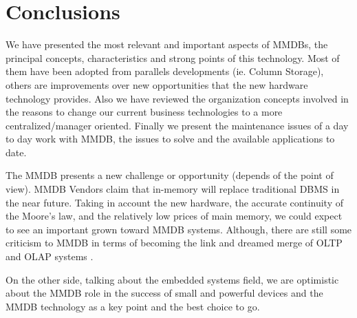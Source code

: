 \documentclass[12pt]{article} %
\begin{document}
\section{Conclusions} 

We have presented the most relevant and important aspects of MMDBs, the principal concepts, characteristics and strong points of this technology. Most of them have been adopted from parallels developments (ie. Column Storage), others are improvements over new opportunities that the new hardware technology provides. Also we have reviewed the organization concepts involved in the reasons to change our current business technologies to a more centralized/manager oriented. Finally we present the maintenance issues of a day to day work with MMDB, the issues to solve and the available applications to date. 

The MMDB presents a new challenge or opportunity (depends of the point of view). MMDB Vendors claim that in-memory will replace traditional DBMS in the near future. Taking in account the new hardware, the accurate continuity of the Moore's law, and the relatively low prices of main memory, we could expect to see an important grown toward MMDB systems. Although, there are still some criticism to MMDB in terms of becoming the link and dreamed merge of OLTP and OLAP systems \cite{whitepaper}.

On the other side, talking about the embedded systems field, we are optimistic about the MMDB role in the success of small and powerful devices and the MMDB technology as a key point and the best choice to go. 


\newpage %



\end{document}

